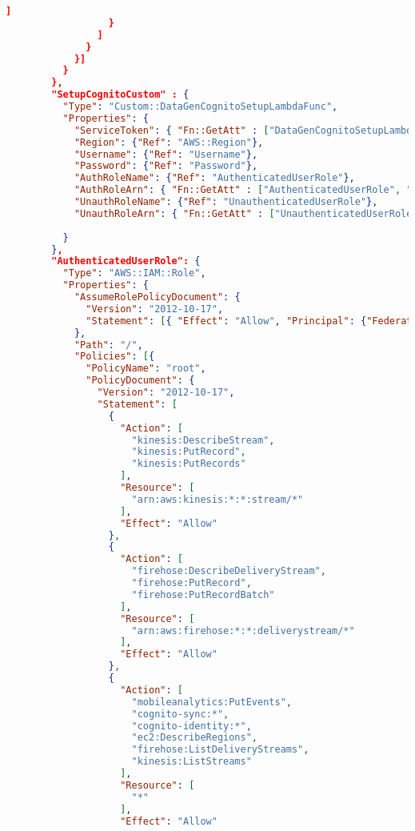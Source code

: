 \begin{lstlisting}[language=json,firstnumber=1]
                    ]
                  }
                ]
              }
            }]
          }
        },
        "SetupCognitoCustom" : {
          "Type": "Custom::DataGenCognitoSetupLambdaFunc",
          "Properties": {
            "ServiceToken": { "Fn::GetAtt" : ["DataGenCognitoSetupLambdaFunc", "Arn"] },
            "Region": {"Ref": "AWS::Region"},
            "Username": {"Ref": "Username"},
            "Password": {"Ref": "Password"},
            "AuthRoleName": {"Ref": "AuthenticatedUserRole"},
            "AuthRoleArn": { "Fn::GetAtt" : ["AuthenticatedUserRole", "Arn"] },
            "UnauthRoleName": {"Ref": "UnauthenticatedUserRole"},
            "UnauthRoleArn": { "Fn::GetAtt" : ["UnauthenticatedUserRole", "Arn"] }
    
          }
        },
        "AuthenticatedUserRole": {
          "Type": "AWS::IAM::Role",
          "Properties": {
            "AssumeRolePolicyDocument": {
              "Version": "2012-10-17",
              "Statement": [{ "Effect": "Allow", "Principal": {"Federated": ["cognito-identity.amazonaws.com"]}, "Action": ["sts:AssumeRoleWithWebIdentity"] }]
            },
            "Path": "/",
            "Policies": [{
              "PolicyName": "root",
              "PolicyDocument": {
                "Version": "2012-10-17",
                "Statement": [
                  {
                    "Action": [
                      "kinesis:DescribeStream",
                      "kinesis:PutRecord",
                      "kinesis:PutRecords"
                    ],
                    "Resource": [
                      "arn:aws:kinesis:*:*:stream/*"
                    ],
                    "Effect": "Allow"
                  },
                  {
                    "Action": [
                      "firehose:DescribeDeliveryStream",
                      "firehose:PutRecord",
                      "firehose:PutRecordBatch"
                    ],
                    "Resource": [
                      "arn:aws:firehose:*:*:deliverystream/*"
                    ],
                    "Effect": "Allow"
                  },
                  {
                    "Action": [
                      "mobileanalytics:PutEvents",
                      "cognito-sync:*",
                      "cognito-identity:*",
                      "ec2:DescribeRegions",
                      "firehose:ListDeliveryStreams",
                      "kinesis:ListStreams"
                    ],
                    "Resource": [
                      "*"
                    ],
                    "Effect": "Allow"

\end{lstlisting}
